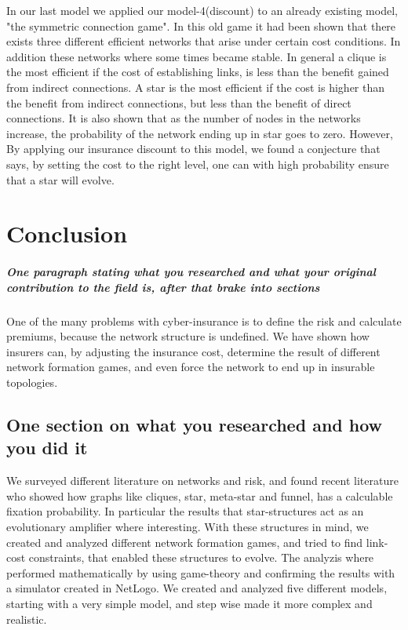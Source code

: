 In our last model we applied our model-4(discount) to an already existing model, "the symmetric connection game". In this old game it had been shown that there exists three different efficient networks that arise under certain cost conditions. In addition these networks where some times became stable. In general a clique is the most efficient if the cost of establishing links, is less than the benefit gained from indirect connections. A star is the most efficient if the cost is higher than the benefit from indirect connections, but less than the benefit of direct connections. 
It is also shown that as the number of nodes in the networks increase, the probability of the network ending up in star goes to zero. However, By applying our insurance discount to this model, we found a conjecture that says, by setting the cost to the right level, one can with high probability ensure that a star will evolve. 



\section{Conclusion}
\subparagraph{One paragraph stating what you researched and what your original contribution to the field is, after that brake into sections}
One of the many problems with cyber-insurance is to define the risk and calculate premiums, because the network structure is undefined. We have shown how insurers can, by adjusting the insurance cost, determine the result of different network formation games, and even force the network to end up in insurable topologies.  
\subsection{One section on what you researched and how you did it}
We surveyed different literature on networks and risk, and found recent literature who showed how graphs like cliques, star, meta-star and funnel, has a calculable fixation probability. In particular the results that star-structures act as an evolutionary amplifier where interesting. 
With these structures in mind, we created and analyzed different network formation games, and tried to find link-cost constraints, that enabled these structures to evolve. 
The analyzis where performed mathematically by using game-theory and confirming the results with a simulator created in NetLogo.
We created and analyzed five different models, starting with a very simple model, and step wise made it more complex and realistic. 
